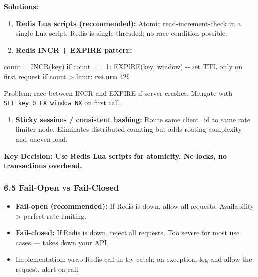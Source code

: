 \documentclass[11pt]{article}
\providecommand{\tightlist}{\setlength{\itemsep}{1pt}\setlength{\parskip}{0pt}}
\newenvironment{Shaded}{\begin{snugshade}}{\end{snugshade}}
\newcommand{\BuiltInTok}[1]{\textcolor[rgb]{0.50,0.55,0.55}{#1}}
\newcommand{\ControlFlowTok}[1]{\textcolor[rgb]{0.99,0.74,0.29}{\textbf{#1}}}
\newcommand{\DecValTok}[1]{\textcolor[rgb]{0.96,0.45,0.00}{#1}}
\newcommand{\NormalTok}[1]{\textcolor[rgb]{0.81,0.81,0.76}{#1}}
\newcommand{\OperatorTok}[1]{\textcolor[rgb]{0.81,0.81,0.76}{#1}}
\begin{document}
\textbf{Solutions:}

\begin{enumerate}
\def\labelenumi{\arabic{enumi}.}
\item
  \textbf{Redis Lua scripts (recommended):} Atomic read-increment-check in a single Lua script. Redis is single-threaded; no race condition possible.
\item
  \textbf{Redis INCR + EXPIRE pattern:}
\end{enumerate}


\begin{Shaded}
\begin{Highlighting}[]
\NormalTok{count }\OperatorTok{=}\NormalTok{ INCR(key)}
\ControlFlowTok{if}\NormalTok{ count }\OperatorTok{==} \DecValTok{1}\NormalTok{: EXPIRE(key, window)  }\OperatorTok{{-}{-}} \BuiltInTok{set}\NormalTok{ TTL only on first request}
\ControlFlowTok{if}\NormalTok{ count }\OperatorTok{\textgreater{}}\NormalTok{ limit: }\ControlFlowTok{return} \DecValTok{429}
\end{Highlighting}
\end{Shaded}

Problem: race between INCR and EXPIRE if server crashes. Mitigate with \texttt{SET\ key\ 0\ EX\ window\ NX} on first call.

\begin{enumerate}
\def\labelenumi{\arabic{enumi}.}
\setcounter{enumi}{2}
\tightlist
\item
  \textbf{Sticky sessions / consistent hashing:} Route same client\_id to same rate limiter node. Eliminates distributed counting but adds routing complexity and uneven load.
\end{enumerate}

\textbf{Key Decision: Use Redis Lua scripts for atomicity. No locks, no transactions overhead.}

\subsubsection{6.5 Fail-Open vs Fail-Closed}\label{65-fail-open-vs-fail-closed}

\begin{itemize}
\tightlist
\item
  \textbf{Fail-open (recommended):} If Redis is down, allow all requests. Availability \textgreater{} perfect rate limiting.
\item
  \textbf{Fail-closed:} If Redis is down, reject all requests. Too severe for most use cases --- takes down your API.
\item
  Implementation: wrap Redis call in try-catch; on exception, log and allow the request, alert on-call.
\end{itemize}
\end{document}
